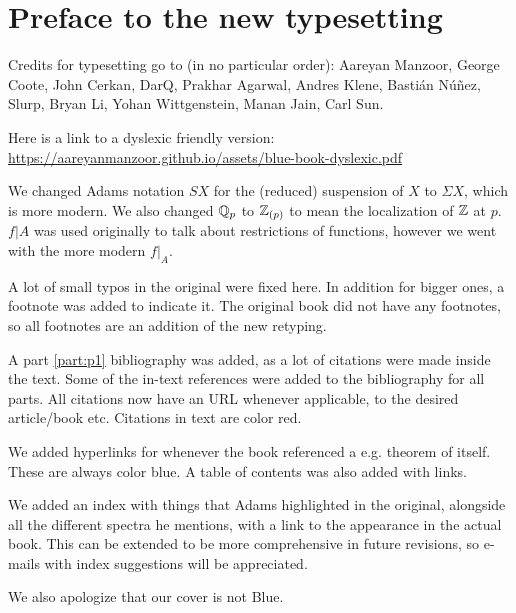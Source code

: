 \documentclass[main]{subfiles}
\begin{document}
\chapter*{Preface to the new typesetting}
Credits for typesetting go to (in no particular order): Aareyan Manzoor, George Coote, John Cerkan, DarQ, Prakhar Agarwal, Andres Klene, Bastián Núñez, Slurp, Bryan Li, Yohan Wittgenstein, Manan Jain, Carl Sun. %

Here is a link to a dyslexic friendly version: \url{https://aareyanmanzoor.github.io/assets/blue-book-dyslexic.pdf}

We changed Adams notation $SX$ for the (reduced) suspension of $X$ to $\Sigma X$, which is more modern. We also changed $\mathbb{Q}_p$ to $\mathbb{Z}_{(p)}$ to mean the localization of $\mathbb{Z}$ at $p$. $f|A$ was used originally to talk about restrictions of functions, however we went with the more modern $f|_A$.

A lot of small typos in the original were fixed here. In addition for bigger ones, a footnote was added to indicate it. The original book did not have any footnotes, so all footnotes are an addition of the new retyping. 

A part \ref{part:p1} bibliography was added, as a lot of citations were made inside the text. Some of the in-text references were added to the bibliography for all parts. All citations now have an URL whenever applicable, to the desired article/book etc. Citations in text are color red.

We added hyperlinks for whenever the book referenced a e.g. theorem of itself. These are always color blue. A table of contents was also added with links.

We added an index with things that Adams highlighted in the original, alongside all the different spectra he mentions, with a link to the appearance in the actual book. This can be extended to be more comprehensive in future revisions, so e-mails with index suggestions will be appreciated.

We also apologize that our cover is not Blue.
\end{document}
